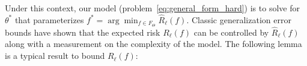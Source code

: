 \documentclass[twoside,11pt]{article}
\begin{document}
Under this context,
our model (problem~\ref{eq:general_form_hard}) is to solve for $\theta^*$ that parameterizes $f^* = \arg\min_{f\in F_\Theta} \hat{R}_\ell(f)$.
Classic generalization error bounds have shown that the expected risk $R_\ell(f)$ can be controlled by
$\hat{R}_\ell(f)$ along with a measurement on the complexity of the model.
The following lemma is a typical result to bound $R_\ell(f)$:

\end{document}
